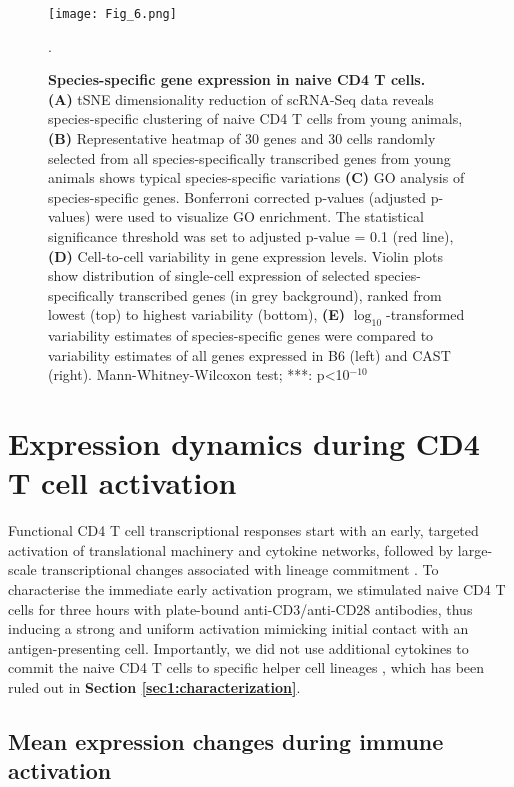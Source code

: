 \begin{figure}[!h]
\centering
\texttt{[image: Fig\_6.png]}
\caption[Species-specific gene expression in naive CD4\plus{} T cells]{\textbf{Species-specific gene expression in naive CD4\plus{} T cells.}\\
\textbf{(A)} tSNE dimensionality reduction of scRNA-Seq data reveals species-specific clustering of naive CD4\plus{} T cells from young animals, \textbf{(B)} Representative heatmap of 30 genes and 30 cells randomly selected from all species-specifically transcribed genes from young animals shows typical species-specific variations \textbf{(C)}  GO analysis of species-specific genes. Bonferroni corrected p-values (adjusted p-values) were used to visualize GO enrichment. The statistical significance threshold was set to adjusted p-value = 0.1 (red line), \textbf{(D)} Cell-to-cell variability in gene expression levels. Violin plots show distribution of single-cell expression of selected species-specifically transcribed genes (in grey background), ranked from lowest (top) to highest variability (bottom), \textbf{(E)} $\log_{10}$-transformed variability estimates of species-specific genes were compared to variability estimates of all genes expressed in B6 (left) and CAST (right). Mann-Whitney-Wilcoxon test; ***: p<10$^{-10}$}.
\label{fig1:species_specific}
\end{figure}

\newpage


\section{Expression dynamics during CD4\plus{} T cell activation}
\label{sec1:activation}

Functional CD4\plus{} T cell transcriptional responses start with an early, targeted activation of translational machinery and cytokine networks, followed by large-scale transcriptional changes associated with lineage commitment \citep{Shay2013, Asmal2003}. To characterise the immediate early activation program, we stimulated naive CD4\plus{} T cells for three hours with plate-bound anti-CD3\textepsilon{}/anti-CD28 antibodies, thus inducing a strong and uniform activation mimicking initial contact with an antigen-presenting cell. Importantly, we did not use additional cytokines to commit the naive CD4\plus{} T cells to specific helper cell lineages \citep{Zhu2010}, which has been ruled out in \textbf{Section \ref{sec1:characterization}}. 

\subsection{Mean expression changes during immune activation}

